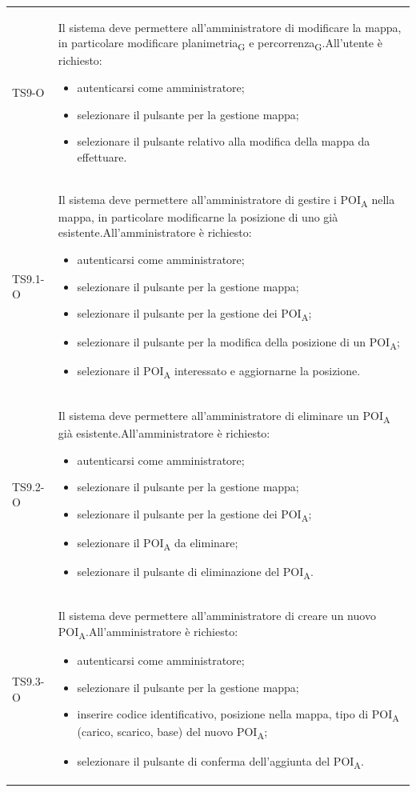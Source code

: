 \begin{longtable}{ >{\centering}p{} >{}p{}}
	TS9-O & Il sistema deve permettere all'amministratore di modificare la mappa, in particolare modificare planimetria\textsubscript{G} e percorrenza\textsubscript{G}.\newline All'utente è richiesto: \begin{itemize} \item autenticarsi come amministratore; \item selezionare il pulsante per la gestione mappa; \item selezionare il pulsante relativo alla modifica della mappa da effettuare.\end{itemize}\tabularnewline
	TS9.1-O & Il sistema deve permettere all'amministratore di gestire i POI\textsubscript{A} nella mappa, in particolare modificarne la posizione di uno già esistente.\newline All'amministratore è richiesto: \begin{itemize}\item autenticarsi come amministratore; \item selezionare il pulsante per la gestione mappa; \item selezionare il pulsante per la gestione dei POI\textsubscript{A}; \item selezionare il pulsante per la modifica della posizione di un POI\textsubscript{A}; \item selezionare il POI\textsubscript{A} interessato e aggiornarne la posizione.\end{itemize}\tabularnewline
	TS9.2-O & Il sistema deve permettere all'amministratore di eliminare un POI\textsubscript{A} già esistente.\newline All'amministratore è richiesto: \begin{itemize}\item autenticarsi come amministratore; \item selezionare il pulsante per la gestione mappa; \item selezionare il pulsante per la gestione dei POI\textsubscript{A}; \item selezionare il POI\textsubscript{A} da eliminare; \item selezionare il pulsante di eliminazione del POI\textsubscript{A}.\end{itemize}\tabularnewline
	TS9.3-O & Il sistema deve permettere all'amministratore di creare un nuovo POI\textsubscript{A}.\newline All'amministratore è richiesto: \begin{itemize}\item autenticarsi come amministratore; \item selezionare il pulsante per la gestione mappa; \item inserire codice identificativo, posizione nella mappa, tipo di POI\textsubscript{A} (carico, scarico, base) del nuovo POI\textsubscript{A}; \item selezionare il pulsante di conferma dell'aggiunta del POI\textsubscript{A}.\end{itemize}\tabularnewline
	

\end{longtable}

